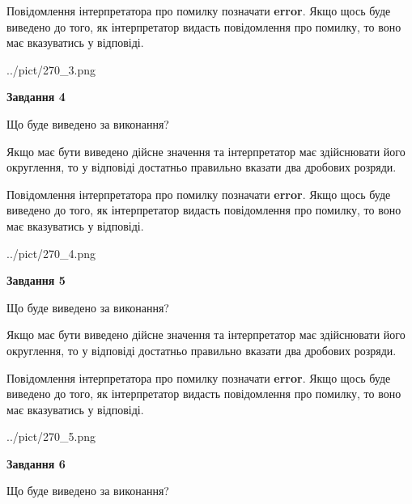 \documentclass[12pt, ukrainian]{article}
\begin{document}
{\begin {Large}
Повідомлення інтерпретатора про помилку позначати \textbf{error}.
Якщо щось буде виведено до того, як інтерпретатор видасть повідомлення про помилку, 
то воно має вказуватись у відповіді. \par

\begin{center}
	{../pict/270_3.png}
\end{center}
\newpage

{\begin {center}\textbf{Завдання 4}\end {center}}\par
Що буде виведено за виконання? \par

Якщо має бути виведено дійсне значення та інтерпретатор має здійснювати його округлення, 
то у відповіді достатньо правильно вказати два дробових розряди.

Повідомлення інтерпретатора про помилку позначати \textbf{error}.
Якщо щось буде виведено до того, як інтерпретатор видасть повідомлення про помилку, 
то воно має вказуватись у відповіді. \par

\begin{center}
	{../pict/270_4.png}
\end{center}
\newpage

{\begin {center}\textbf{Завдання 5}\end {center}}\par
Що буде виведено за виконання? \par

Якщо має бути виведено дійсне значення та інтерпретатор має здійснювати його округлення, 
то у відповіді достатньо правильно вказати два дробових розряди.

Повідомлення інтерпретатора про помилку позначати \textbf{error}.
Якщо щось буде виведено до того, як інтерпретатор видасть повідомлення про помилку, 
то воно має вказуватись у відповіді. \par

\begin{center}
	{../pict/270_5.png}
\end{center}
\newpage

{\begin {center}\textbf{Завдання 6}\end {center}}\par
Що буде виведено за виконання? \par


\end{Large}}
\end{document}
